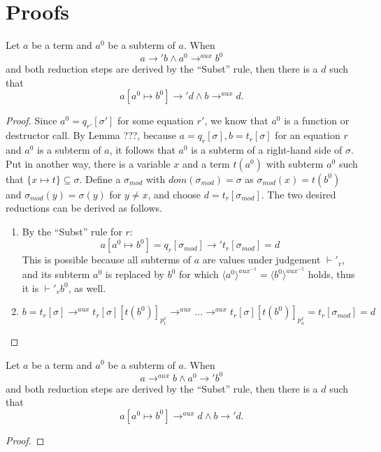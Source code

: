 \chapter{Proofs}

\begin{lemma}
Let $a$ be a term and $a^0$ be a subterm of $a$. When
\[
a \longrightarrow' b \land a^0 \longrightarrow^{aux} b^0
\]
and both reduction steps are derived by the ``Subst'' rule, then there is a $d$ such that
\[
a[a^0 \mapsto b^0] \longrightarrow' d \land b \longrightarrow^{aux} d.
\]

\begin{proof}
Since $a^0 = q_{r'}[\sigma']$ for some equation $r'$, we know that $a^0$ is a function or destructor call. By Lemma ???, because $a = q_r[\sigma], b = t_r[\sigma]$ for an equation $r$ and $a^0$ is a subterm of $a$, it follows that $a^0$ is a subterm of a right-hand side of $\sigma$. Put in another way, there is a variable $x$ and a term $t(a^0)$ with subterm $a^0$ such that $\{x \mapsto t\} \subseteq \sigma$. Define a $\sigma_{mod}$ with $dom(\sigma_{mod}) = \sigma$ as $\sigma_{mod}(x) = t(b^0)$ and $\sigma_{mod}(y) = \sigma(y)$ for $y \neq x$, and choose $d = t_r[\sigma_{mod}]$. The two desired reductions can be derived as follows.
\begin{enumerate}
\item By the ``Subst'' rule for $r$:
\[
a[a^0 \mapsto b^0] = q_r[\sigma_{mod}] \longrightarrow' t_r[\sigma_{mod}] = d
\]
This is possible because all subterms of $a$ are values under judgement $\vdash'_v$, and its subterm $a^0$ is replaced by $b^0$ for which $\langle a^0 \rangle^{aux^{-1}} = \langle b^0 \rangle^{aux^{-1}}$ holds, thus it is $\vdash'_v b^0$, as well.

\item
\[
b = t_r[\sigma] \longrightarrow^{aux} t_r[\sigma][t(b^0)]_{p^x_1} \longrightarrow^{aux} ... \longrightarrow^{aux} t_r[\sigma][t(b^0)]_{p^x_n} = t_r[\sigma_{mod}] = d
\]
\end{enumerate}
\end{proof}
\end{lemma}

\begin{lemma}
Let $a$ be a term and $a^0$ be a subterm of $a$. When
\[
a \longrightarrow^{aux} b \land a^0 \longrightarrow' b^0
\]
and both reduction steps are derived by the ``Subst'' rule, then there is a $d$ such that
\[
a[a^0 \mapsto b^0] \longrightarrow^{aux} d \land b \longrightarrow' d.
\]

\begin{proof}
\end{proof}
\end{lemma}

